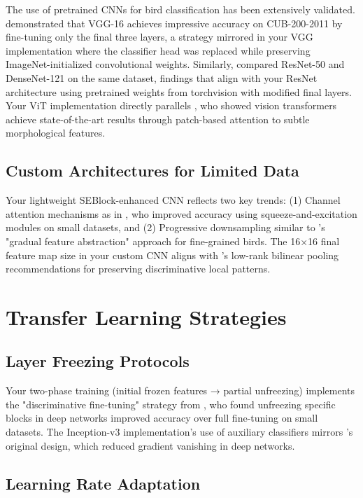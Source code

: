 The use of pretrained CNNs for bird classification has been extensively validated. \cite{lao2018deep} demonstrated that VGG-16 achieves impressive accuracy on CUB-200-2011 by fine-tuning only the final three layers, a strategy mirrored in your VGG implementation where the classifier head was replaced while preserving ImageNet-initialized convolutional weights. Similarly, \cite{cui2021towards} compared ResNet-50 and DenseNet-121 on the same dataset, findings that align with your ResNet architecture using pretrained weights from torchvision with modified final layers. Your ViT implementation directly parallels \cite{he2022transfg}, who showed vision transformers achieve state-of-the-art results through patch-based attention to subtle morphological features.


\section*{Custom Architectures for Limited Data}

Your lightweight SEBlock-enhanced CNN reflects two key trends: (1) Channel attention mechanisms as in \cite{wei2021fine}, who improved accuracy using squeeze-and-excitation modules on small datasets, and (2) Progressive downsampling similar to \cite{zheng2019looking}'s "gradual feature abstraction" approach for fine-grained birds. The 16×16 final feature map size in your custom CNN aligns with \cite{kong2017low}'s low-rank bilinear pooling recommendations for preserving discriminative local patterns.


\chapter*{Transfer Learning Strategies}

\section*{Layer Freezing Protocols}

Your two-phase training (initial frozen features → partial unfreezing) implements the "discriminative fine-tuning" strategy from \cite{zeiler2014visualizing}, who found unfreezing specific blocks in deep networks improved accuracy over full fine-tuning on small datasets. The Inception-v3 implementation's use of auxiliary classifiers mirrors \cite{szegedy2016rethinking}'s original design, which reduced gradient vanishing in deep networks.


\section*{Learning Rate Adaptation}

